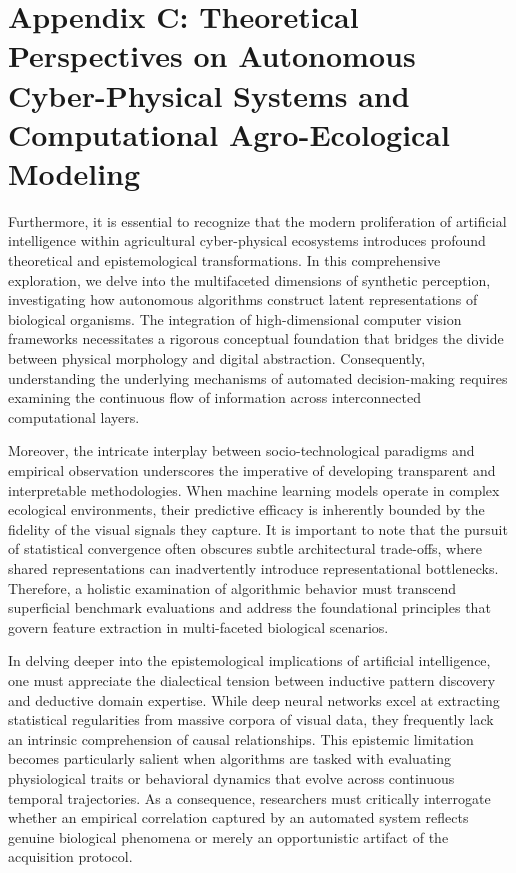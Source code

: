 \documentclass[Times,12pt,oneside,openany,print,index]{report}
\begin{document}
\chapter*{Appendix C: Theoretical Perspectives on Autonomous Cyber-Physical Systems and Computational Agro-Ecological Modeling}

Furthermore, it is essential to recognize that the modern proliferation of artificial intelligence within agricultural cyber-physical ecosystems introduces profound theoretical and epistemological transformations. In this comprehensive exploration, we delve into the multifaceted dimensions of synthetic perception, investigating how autonomous algorithms construct latent representations of biological organisms. The integration of high-dimensional computer vision frameworks necessitates a rigorous conceptual foundation that bridges the divide between physical morphology and digital abstraction. Consequently, understanding the underlying mechanisms of automated decision-making requires examining the continuous flow of information across interconnected computational layers.

Moreover, the intricate interplay between socio-technological paradigms and empirical observation underscores the imperative of developing transparent and interpretable methodologies. When machine learning models operate in complex ecological environments, their predictive efficacy is inherently bounded by the fidelity of the visual signals they capture. It is important to note that the pursuit of statistical convergence often obscures subtle architectural trade-offs, where shared representations can inadvertently introduce representational bottlenecks. Therefore, a holistic examination of algorithmic behavior must transcend superficial benchmark evaluations and address the foundational principles that govern feature extraction in multi-faceted biological scenarios.

In delving deeper into the epistemological implications of artificial intelligence, one must appreciate the dialectical tension between inductive pattern discovery and deductive domain expertise. While deep neural networks excel at extracting statistical regularities from massive corpora of visual data, they frequently lack an intrinsic comprehension of causal relationships. This epistemic limitation becomes particularly salient when algorithms are tasked with evaluating physiological traits or behavioral dynamics that evolve across continuous temporal trajectories. As a consequence, researchers must critically interrogate whether an empirical correlation captured by an automated system reflects genuine biological phenomena or merely an opportunistic artifact of the acquisition protocol.
\end{document}
